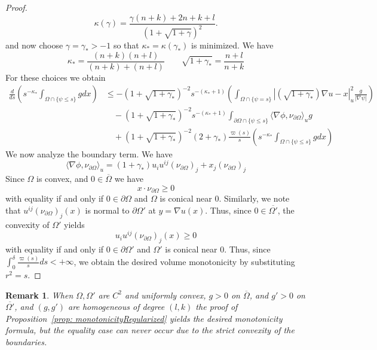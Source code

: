 \documentclass[12pt,reqno]{amsart}
\newtheorem{remark}{Remark}[section]
\newcommand{\del}{\partial}
\numberwithin{equation}{section}
\begin{document}
\begin{proof}
\[\kappa(\gamma) = \frac{\gamma(n+k) +2n+k +l}{(1+\sqrt{1+\gamma})^2}.
\]
and now choose $\gamma = \gamma_*>-1$ so that $\kappa_*= \kappa(\gamma_*)$ is minimized.  We have
\begin{equation}\label{eq: kappagammastar}
\kappa_{*} = \frac{(n+k)(n+l)}{(n+k)+(n+l)} \qquad \sqrt{1+\gamma_*} = \frac{n+l}{n+k}
\end{equation}
For these choices we obtain
\begin{equation}\label{eq: monotonicityVersion1}
\begin{aligned}
    \frac{d}{ds}\left(s^{-\kappa_*}\int_{\Omega\cap \{\psi \leq s\}} gdx\right) &\leq  -(1+\sqrt{1+\gamma_*})^{-2}s^{-(\kappa_*+1)}\left(\int_{\Omega \cap \{\psi =s\}}|(\sqrt{1+\gamma_*}) \nabla u -x|^2_{u}\frac{g}{|\nabla \psi|}\right)\\
    &\quad -(1+\sqrt{1+\gamma_*})^{-2}s^{-(\kappa_*+1)}\int_{\del \Omega \cap \{\psi \leq s\}} \langle \nabla \phi, \nu_{\del \Omega}\rangle_u g\\
    &\quad +(1+\sqrt{1+\gamma_*})^{-2}(2+\gamma_*)\frac{\varpi(s)}{s}\left(s^{-\kappa_*}\int_{\Omega\cap \{\psi \leq s\}} gdx\right)
\end{aligned}
\end{equation}
We now analyze the boundary term.  We have
\[
\langle \nabla \phi, \nu_{\del \Omega}\rangle_u= (1+\gamma_*)u_iu^{ij}(\nu_{\del\Omega})_j + x_j(\nu_{\del\Omega})_{j}
\]
Since $\Omega$ is convex, and $0\in \overline{\Omega}$ we have
\[
x\cdot \nu_{\del\Omega} \geq 0
\]
with equality if and only if $0\in \del \Omega$ and $\Omega$ is conical near $0$.  Similarly, we note that $u^{ij}(\nu_{\del\Omega})_j(x)$ is normal to $\del \Omega'$ at $y=\nabla u(x)$.  Thus, since $0 \in \overline{\Omega'}$,  the convexity of $\Omega'$ yields
\[
u_iu^{ij}(\nu_{\del\Omega})_j(x) \geq 0
\]
with equality if and only if $0\in \del \Omega'$ and $\Omega'$ is conical near $0$.  Thus, since $\int_0^{\delta} \frac{\varpi(s)}{s}ds < +\infty$, we obtain the desired volume monotonicity by substituting $r^2 = s$. 
\end{proof}

\begin{remark}\label{rk: FormalProof}
      When $\Omega, \Omega'$ are $C^{2}$ and uniformly convex, $g>0$ on $\overline{\Omega}$, and $g'>0$ on $\overline{\Omega'}$, and $(g,g')$ are homogeneous of degree $(l,k)$ the proof of Proposition~\ref{prop: monotonicityRegularized} yields the desired monotonicity formula, but the equality case can never occur due to the strict convexity of the boundaries.
\end{remark}
\end{document}
